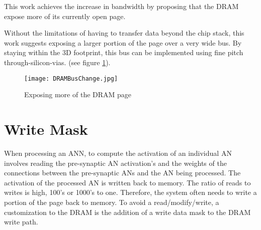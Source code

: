 This work achieves the increase in bandwidth by proposing that the DRAM expose more of its currently open page.

Without the limitations of having to transfer data beyond the chip stack, this work suggests exposing a larger portion of the page over a very wide bus. By staying within the 3D footprint, this bus can be implemented using fine pitch through-silicon-vias.
(see figure \ref{fig:dramBusChange}).

\begin{figure}[!t]
\centering
\captionsetup{justification=centering}
\captionsetup{width=.9\linewidth}
\centerline{
\mbox{\texttt{[image: DRAMBusChange.jpg]}}
}
\caption{Exposing more of the DRAM page}
\label{fig:dramBusChange}
\end{figure}

\section{Write Mask}
\label{sec:Write Mask}
When processing an ANN, to compute the activation of an individual AN involves reading the pre-synaptic AN activation's and the weights of the connections between the pre-synaptic ANs and the AN being processed. The activation of the processed AN is written back to memory. The ratio of reads to writes is high, 100's or 1000's to one. Therefore, the system often needs to write a portion of the page back to memory. To avoid a read/modify/write, a customization to the DRAM is the addition of a write data mask to the DRAM write path.


